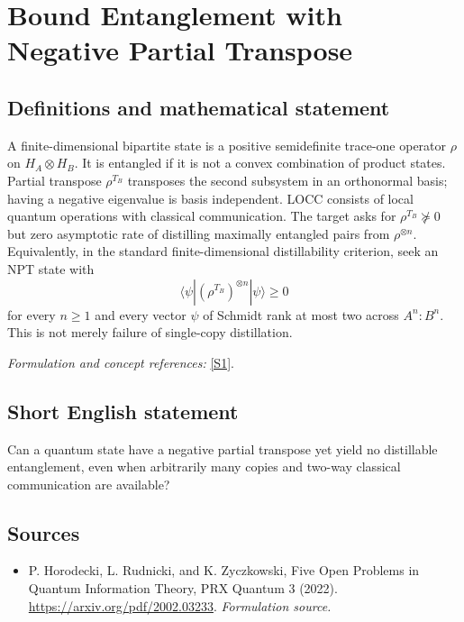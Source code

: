 \documentclass[11pt]{article}
\begin{document}
\section*{\texorpdfstring{Bound Entanglement with Negative Partial Transpose}{Bound Entanglement with Negative Partial Transpose}}\label{statement}
\subsection{Definitions and mathematical statement}
A finite-dimensional bipartite state is a positive semidefinite trace-one operator $\rho$ on $H_A\otimes H_B$. It is entangled if it is not a convex combination of product states. Partial transpose $\rho^{T_B}$ transposes the second subsystem in an orthonormal basis; having a negative eigenvalue is basis independent. LOCC consists of local quantum operations with classical communication. The target asks for $\rho^{T_B}\not\succeq0$ but zero asymptotic rate of distilling maximally entangled pairs from $\rho^{\otimes n}$. Equivalently, in the standard finite-dimensional distillability criterion, seek an NPT state with
\[
 \langle\psi|(\rho^{T_B})^{\otimes n}|\psi\rangle\ge0
\]
for every $n\ge1$ and every vector $\psi$ of Schmidt rank at most two across $A^n:B^n$. This is not merely failure of single-copy distillation.
\par\smallskip\textit{Formulation and concept references:} \href{https://arxiv.org/pdf/2002.03233}{[S1]}.

\subsection{Short English statement}
Can a quantum state have a negative partial transpose yet yield no distillable entanglement, even when arbitrarily many copies and two-way classical communication are available?
\subsection{Sources}
\begin{itemize}
\item[S1]P. Horodecki, L. Rudnicki, and K. Zyczkowski, Five Open Problems in Quantum Information Theory, PRX Quantum 3 (2022).
\url{https://arxiv.org/pdf/2002.03233}.
\textit{Formulation source.}
\end{itemize}
\end{document}
